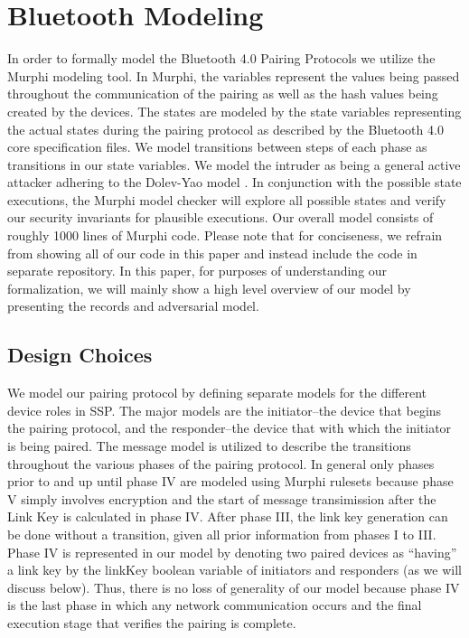 \documentclass{acm_proc_article-sp}
\begin{document}
\section{Bluetooth Modeling}
In order to formally model the Bluetooth 4.0 Pairing Protocols we utilize the Murphi modeling tool. In Murphi, the variables represent the values being passed throughout the communication of the pairing as well as the hash values being created by the devices. The states are modeled by the state variables representing the actual states during the pairing protocol as described by the Bluetooth 4.0 core specification files. We model transitions between steps of each phase as transitions in our state variables. We model the intruder as being a general active attacker adhering to the Dolev-Yao model \cite{dolev:yao}. In conjunction with the possible state executions, the Murphi model checker will explore all possible states and verify our security invariants for plausible executions. Our overall model consists of roughly 1000 lines of Murphi code. Please note that for conciseness, we refrain from showing all of our code in this paper and instead include the code in separate repository. In this paper, for purposes of understanding our formalization, we will mainly show a high level overview of our model by presenting the records and adversarial model.

\subsection{Design Choices}
We model our pairing protocol by defining separate models for the different device roles in SSP. The major models are the initiator--the device that begins the pairing protocol, and the responder--the device that with which the initiator is being paired. The message model is utilized to describe the transitions throughout the various phases of the pairing protocol. In general only phases prior to and up until phase IV are modeled using Murphi rulesets because phase V simply involves encryption and the start of message transimission after the Link Key is calculated in phase IV. After phase III, the link key generation can be done without a transition, given all prior information from phases I to III. Phase IV is represented in our model by denoting two paired devices as ``having'' a link key by the linkKey boolean variable of initiators and responders (as we will discuss below). Thus, there is no loss of generality of our model because phase IV is the last phase in which any network communication occurs and the final execution stage that verifies the pairing is complete.
\end{document}
